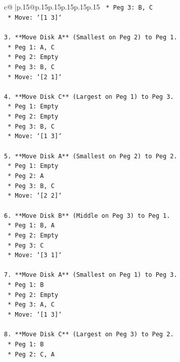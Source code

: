 \documentclass{article}
\begin{document}
{\begin{supertabular}{c@{$\;$}|p{.15\linewidth}@{}p{.15\linewidth}p{.15\linewidth}p{.15\linewidth}p{.15\linewidth}p{.15\linewidth}}
{{{\texttt{    *   Peg 3: B, C} \\
\texttt{    *   Move: `{[}1 3{]}`} \\
\\ 
\texttt{3.  **Move Disk A** (Smallest on Peg 2) to Peg 1.} \\
\texttt{    *   Peg 1: A, C} \\
\texttt{    *   Peg 2: Empty} \\
\texttt{    *   Peg 3: B, C} \\
\texttt{    *   Move: `{[}2 1{]}`} \\
\\ 
\texttt{4.  **Move Disk C** (Largest on Peg 1) to Peg 3.} \\
\texttt{    *   Peg 1: Empty} \\
\texttt{    *   Peg 2: Empty} \\
\texttt{    *   Peg 3: B, C} \\
\texttt{    *   Move: `{[}1 3{]}`} \\
\\ 
\texttt{5.  **Move Disk A** (Smallest on Peg 2) to Peg 2.} \\
\texttt{    *   Peg 1: Empty} \\
\texttt{    *   Peg 2: A} \\
\texttt{    *   Peg 3: B, C} \\
\texttt{    *   Move: `{[}2 2{]}`} \\
\\ 
\texttt{6.  **Move Disk B** (Middle on Peg 3) to Peg 1.} \\
\texttt{    *   Peg 1: B, A} \\
\texttt{    *   Peg 2: Empty} \\
\texttt{    *   Peg 3: C} \\
\texttt{    *   Move: `{[}3 1{]}`} \\
\\ 
\texttt{7.  **Move Disk A** (Smallest on Peg 1) to Peg 3.} \\
\texttt{    *   Peg 1: B} \\
\texttt{    *   Peg 2: Empty} \\
\texttt{    *   Peg 3: A, C} \\
\texttt{    *   Move: `{[}1 3{]}`} \\
\\ 
\texttt{8.  **Move Disk C** (Largest on Peg 3) to Peg 2.} \\
\texttt{    *   Peg 1: B} \\
\texttt{    *   Peg 2: C, A} \\
}}}
\end{supertabular}}
\end{document}
